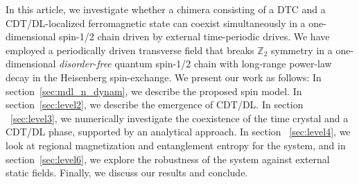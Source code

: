 \documentclass[%
nofootinbib,
reprint,
superscriptaddress,
amsmath,amssymb,showkeys,
aps,
prb,
]{revtex4-2}
\begin{document}
	In this article, we investigate whether a chimera consisting of a DTC and a CDT/DL-localized ferromagnetic state can coexist simultaneously in a one-dimensional spin-1/2 chain driven by external time-periodic drives. We have employed a periodically driven transverse field that breaks $\mathbb{Z}_2$ symmetry in a one-dimensional \textit{disorder-free} quantum spin-1/2 chain with long-range power-law decay in the Heisenberg spin-exchange. We present our work as follows: In section~\ref{sec:mdl_n_dynam}, we describe the proposed spin model. In section~\ref{sec:level2}, we describe the emergence of CDT/DL. In section ~\ref{sec:level3}, we numerically investigate the coexistence of the time crystal and a CDT/DL phase, supported by an analytical approach. In section ~\ref{sec:level4}, we look at regional magnetization and  entanglement entropy for the system, and in section~\ref{sec:level6}, we explore the robustness of the system against  external static fields. Finally, we discuss our results and conclude.	
	
\end{document}
